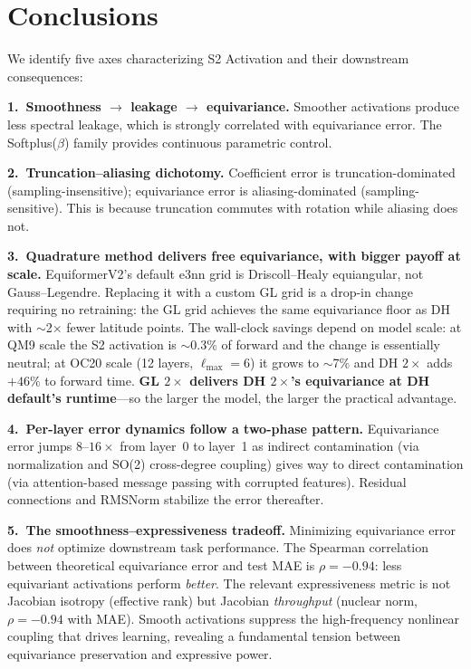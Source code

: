 \documentclass[10pt,twocolumn]{article}
\begin{document}
\section{Conclusions}
\label{sec:conclusions}

We identify five axes characterizing S2 Activation and their downstream consequences:

\textbf{1.\ Smoothness $\to$ leakage $\to$ equivariance.}
Smoother activations produce less spectral leakage, which is strongly correlated with
equivariance error. The Softplus($\beta$) family provides continuous parametric control.

\textbf{2.\ Truncation--aliasing dichotomy.}
Coefficient error is truncation-dominated (sampling-insensitive); equivariance error is
aliasing-dominated (sampling-sensitive). This is because truncation commutes with rotation
while aliasing does not.

\textbf{3.\ Quadrature method delivers free equivariance, with bigger payoff at scale.}
EquiformerV2's default e3nn grid is Driscoll--Healy equiangular, not Gauss--Legendre.
Replacing it with a custom GL grid is a drop-in change requiring no retraining: the GL
grid achieves the same equivariance floor as DH with $\sim$2$\times$ fewer latitude
points. The wall-clock savings depend on model scale: at QM9 scale the S2 activation
is $\sim$0.3\% of forward and the change is essentially neutral; at OC20 scale
(12 layers, $\ell_{\max}{=}6$) it grows to $\sim$7\% and DH $2\times$ adds $+46\%$
to forward time. \textbf{GL $2\times$ delivers DH $2\times$'s equivariance at DH
default's runtime}---so the larger the model, the larger the practical advantage.

\textbf{4.\ Per-layer error dynamics follow a two-phase pattern.}
Equivariance error jumps $8$--$16\times$ from layer~0 to layer~1 as indirect contamination
(via normalization and SO(2) cross-degree coupling) gives way to direct contamination
(via attention-based message passing with corrupted features). Residual connections and
RMSNorm stabilize the error thereafter.

\textbf{5.\ The smoothness--expressiveness tradeoff.}
Minimizing equivariance error does \emph{not} optimize downstream task performance.
The Spearman correlation between theoretical equivariance error and test MAE is
$\rho = -0.94$: less equivariant activations perform \emph{better}.
The relevant expressiveness metric is not Jacobian isotropy (effective rank) but
Jacobian \emph{throughput} (nuclear norm, $\rho = -0.94$ with MAE). Smooth activations
suppress the high-frequency nonlinear coupling that drives learning, revealing a
fundamental tension between equivariance preservation and expressive power.
\end{document}
